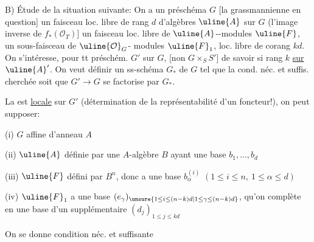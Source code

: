 B) Étude de la situation suivante: On a un préschéma $G$ [la grassmannienne en question] un faisceau loc. libre de rang $d$ d'algèbres $\uline{A}$ sur $G$ (l'image inverse de $f_*(\mathcal O_T)$] un faisceau loc. libre de $\uline{A}$--modules $\uline{F}$, un sous-faisceau de $\uline{\mathcal O}_G$- modules $\uline{F}_1$,  loc. libre de corang $kd$.
On s'intéresse, pour tt préschém. $G'$ sur $G$, [non $G\times_S S'$] de savoir si    rang $k$ \uline{sur $\uline{A}'$}. On veut définir un ss-schéma  $G_*$ de $G$ tel que la cond. néc. et suffis. cherchée soit que $G'\longrightarrow G$ se factorise par $G_*$.

La   est \uline{locale} sur $G'$ (détermination de la représentabilité d'un foncteur!), on peut supposer: 

(i) $G$ affine d'anneau $A$

(ii) $\uline{A}$ définie par une $A$-algèbre $B$ ayant une base $b_1,\ldots,b_d$

(iii) $\uline{F}$ défini par $B^n$, donc a une base $b_\alpha^{(i)}$ $(1\leq i\leq n,\ 1\leq\alpha\leq d)$

(iv) $\uline{F}_1$ a une base  $(e_\gamma)_{\unsure{1\leq i\leq(n-k)d|1\leq\gamma\leq(n-k)d}}$, qu'on complète en une base d'un supplémentaire $(d_j)_{1\leq j\leq kd}$

On se donne   condition néc. et suffisante
